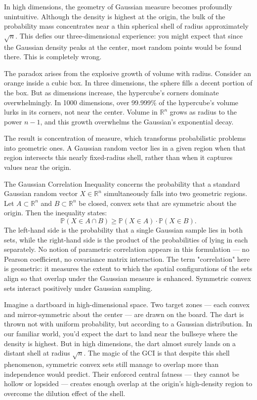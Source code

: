 In high dimensions, the geometry of Gaussian measure becomes profoundly unintuitive. Although the density is highest at the origin, the bulk of the probability mass concentrates near a thin spherical shell of radius approximately \( \sqrt{n} \). This defies our three-dimensional experience: you might expect that since the Gaussian density peaks at the center, most random points would be found there. This is completely wrong.

The paradox arises from the explosive growth of volume with radius. Consider an orange inside a cubic box. In three dimensions, the sphere fills a decent portion of the box. But as dimensions increase, the hypercube's corners dominate overwhelmingly. In 1000 dimensions, over 99.999\% of the hypercube's volume lurks in its corners, not near the center. Volume in \( \mathbb{R}^n \) grows as radius to the power \( n-1 \), and this growth overwhelms the Gaussian's exponential decay.

The result is concentration of measure, which transforms probabilistic problems into geometric ones. A Gaussian random vector lies in a given region when that region intersects this nearly fixed-radius shell, rather than when it captures values near the origin.

The Gaussian Correlation Inequality concerns the probability that a standard Gaussian random vector \( X \in \mathbb{R}^n \) simultaneously falls into two geometric regions. Let \( A \subset \mathbb{R}^n \) and \( B \subset \mathbb{R}^n \) be closed, convex sets that are symmetric about the origin. Then the inequality states:
\[
\mathbb{P}(X \in A \cap B) \geq \mathbb{P}(X \in A) \cdot \mathbb{P}(X \in B).
\]
The left-hand side is the probability that a single Gaussian sample lies in both sets, while the right-hand side is the product of the probabilities of lying in each separately. No notion of parametric correlation appears in this formulation — no Pearson coefficient, no covariance matrix interaction. The term "correlation" here is geometric: it measures the extent to which the spatial configurations of the sets align so that overlap under the Gaussian measure is enhanced. Symmetric convex sets interact positively under Gaussian sampling.

Imagine a dartboard in high-dimensional space. Two target zones — each convex and mirror-symmetric about the center — are drawn on the board. The dart is thrown not with uniform probability, but according to a Gaussian distribution. In our familiar world, you'd expect the dart to land near the bullseye where the density is highest. But in high dimensions, the dart almost surely lands on a distant shell at radius \( \sqrt{n} \). The magic of the GCI is that despite this shell phenomenon, symmetric convex sets still manage to overlap more than independence would predict. Their enforced central fatness — they cannot be hollow or lopsided — creates enough overlap at the origin's high-density region to overcome the dilution effect of the shell.

